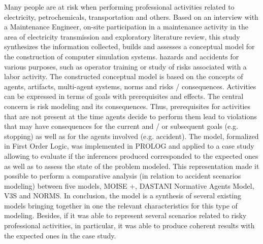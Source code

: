 Many people are at risk when performing professional activities related to electricity, petrochemicals, transportation and others. Based on an interview with a Maintenance Engineer, on-site participation in a maintenance activity in the area of ​​electricity transmission and exploratory literature review, this study synthesizes the information collected, builds and assesses a conceptual model for the construction of computer simulation systems. hazards and accidents for various purposes, such as operator training or study of risks associated with a labor activity. The constructed conceptual model is based on the concepts of agents, artifacts, multi-agent systems, norms and risks / consequences. Activities can be expressed in terms of goals with prerequisites and effects. The central concern is risk modeling and its consequences. Thus, prerequisites for activities that are not present at the time agents decide to perform them lead to violations that may have consequences for the current and / or subsequent goals (e.g. stopping) as well as for the agents involved (e.g. accident). The model, formalized in First Order Logic, was implemented in PROLOG and applied to a case study allowing to evaluate if the inferences produced corresponded to the expected ones as well as to assess the state of the problem modeled. This representation made it possible to perform a comparative analysis (in relation to accident scenarios modeling) between five models, MOISE +, DASTANI Normative Agents Model, V3S and NORMS. In conclusion, the model is a synthesis of several existing models bringing together in one the relevant characteristics for this type of modeling. Besides, if it was able to represent several scenarios related to risky professional activities, in particular, it was able to produce coherent results with the expected ones in the case study.